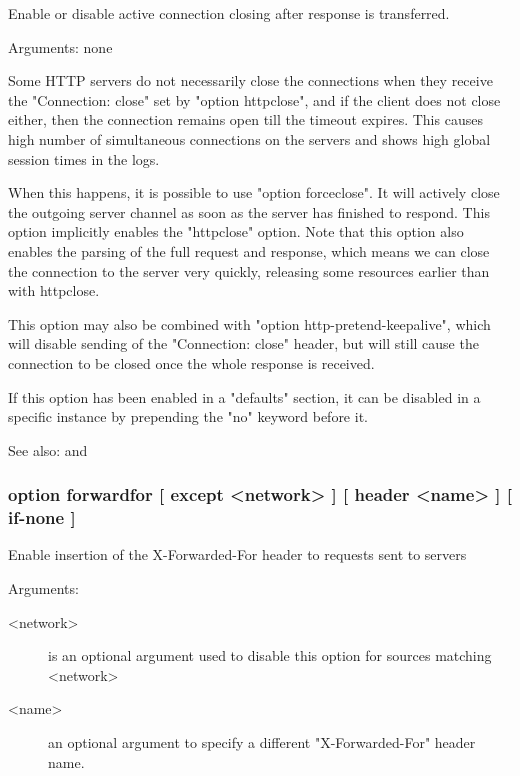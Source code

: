 
  Enable or disable active connection closing after response is transferred.


  Arguments: none

  Some HTTP servers do not necessarily close the connections when they receive
  the "Connection: close" set by "option httpclose", and if the client does not
  close either, then the connection remains open till the timeout expires. This
  causes high number of simultaneous connections on the servers and shows high
  global session times in the logs.

  When this happens, it is possible to use "option forceclose". It will
  actively close the outgoing server channel as soon as the server has finished
  to respond. This option implicitly enables the "httpclose" option. Note that
  this option also enables the parsing of the full request and response, which
  means we can close the connection to the server very quickly, releasing some
  resources earlier than with httpclose.

  This option may also be combined with "option http-pretend-keepalive", which
  will disable sending of the "Connection: close" header, but will still cause
  the connection to be closed once the whole response is received.

  If this option has been enabled in a "defaults" section, it can be disabled
  in a specific instance by prepending the "no" keyword before it.

  See also:  and 


\subsubsection[option forwardfor]{option forwardfor [ except <network> ] [ header <name> ] [ if-none ]}


  Enable insertion of the X-Forwarded-For header to requests sent to servers


  Arguments:
\begin{description}
\item[<network>] is an optional argument used to disable this option for sources
              matching <network>
\item[<name>]    an optional argument to specify a different "X-Forwarded-For"
              header name.
\end{description}

